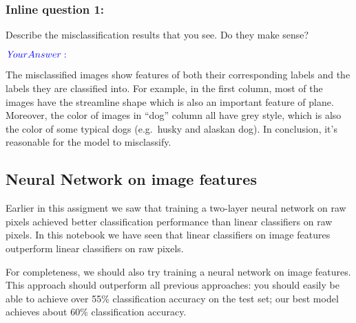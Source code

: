 \documentclass[11pt]{article}
\begin{document}
    \begin{center}
    \end{center}
    { \hspace*{\fill} \\}
    
    \hypertarget{inline-question-1}{%
\subsubsection{Inline question 1:}\label{inline-question-1}}

Describe the misclassification results that you see. Do they make sense?

\(\color{blue}{\textit Your Answer:}\)

The misclassified images show features of both their corresponding
labels and the labels they are classified into. For example, in the
first column, most of the images have the streamline shape which is also
an important feature of plane. Moreover, the color of images in ``dog''
column all have grey style, which is also the color of some typical dogs
(e.g.~husky and alaskan dog). In conclusion, it's reasonable for the
model to misclassify.

    \hypertarget{neural-network-on-image-features}{%
\subsection{Neural Network on image
features}\label{neural-network-on-image-features}}

Earlier in this assigment we saw that training a two-layer neural
network on raw pixels achieved better classification performance than
linear classifiers on raw pixels. In this notebook we have seen that
linear classifiers on image features outperform linear classifiers on
raw pixels.

For completeness, we should also try training a neural network on image
features. This approach should outperform all previous approaches: you
should easily be able to achieve over 55\% classification accuracy on
the test set; our best model achieves about 60\% classification
accuracy.
\end{document}

